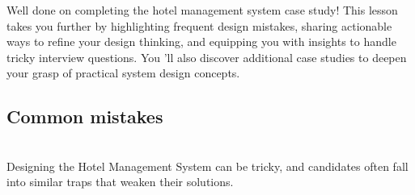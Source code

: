 

Well done on completing the hotel management system case study! This lesson takes you further by highlighting frequent design mistakes, sharing actionable ways to refine your design thinking, and equipping you with insights to handle tricky interview questions. You 'll also discover additional case studies to deepen your grasp of practical system design concepts.

\subsection{Common mistakes}\label{e2-gHdeBFlSE6eHtXbHkc}
\\
Designing the Hotel Management System can be tricky, and candidates often fall into similar traps that weaken their solutions.

